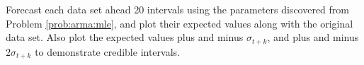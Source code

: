 \begin{problem}
    Forecast each data set ahead 20 intervals using the parameters discovered
    from Problem \ref{prob:arma:mle}, and plot their expected values along with
    the original data set. Also plot the expected values plus and minus
    $\sigma_{t+k}$, and plus and minus $2\sigma_{t+k}$ to demonstrate credible
    intervals. 
\end{problem}


\begin{comment}

The Box-Jenkins methodology may be too esoteric, in light of straightforward
alternatives such as the AICc. I have decided to leave this material out.

\section*{Identification}

If we have a time series $\{z_t\}$ and wish to fit an $ARMA(p,q)$ to it, we
must first identify the order of the model, that is, what $p$ and $q$ should
be. We discuss a methodology presented by Box and Jenkins that depends on the
autocorrelations and partial-autocorrelations of the data. Alternative methods
exist, such as using the Akaike information criterion with a correction (AICc).

\subsection*{Autocorrelation}

The autocorrelation between between $z_{t}, z_{t+k}$ is defined as the
normalized covariance between the two random variables, verbosely given as
\begin{align}
    \label{eq:arma:autocorrelation}
    \text{cor}[z_{t}, z_{t+k}] = \frac{E[(z_{t} - E[z_{t}])(z_{t+k} -
    E[z_{t+k}])]}{\sqrt{E[(z_{t} - E[z_{t}])^2(z_{t+k} - E[z_{t+k}])^2]}}
\end{align}
Since the $\{z_t\}$ is assumed to be covariance-stationary,
\ref{eq:arma:autocorrelation} depends only on the lag $k$, not on $t$. This
justifies the notation
\begin{align}
    \rho_k = \text{cor}[z_{t}, z_{t+k}] \quad \forall t
\end{align}
When $\rho_k$ is considered a function of $k$, it is called the autocorrelation
function. Since $\rho_0 = 1, \rho_{-k} = \rho_k$, we will be interested in the
cases when $k > 0$. We can estimate $\rho_k$ from sample data as
\begin{align}
    \label{eq:arma:autocorrelation_estimate}
    \hat{\rho}_k = \frac{\sum_{t=1}^{N-k}(z_t - \hat{\mu})(z_{t+k} -
    \hat{\mu})}{\sum_{t=1}^{N}(z_t - \hat{\mu})^2}
\end{align}
where $\hat{\mu}$ is the sample mean. This is one of a number of estimates of
autocorrelation.


\end{comment}
